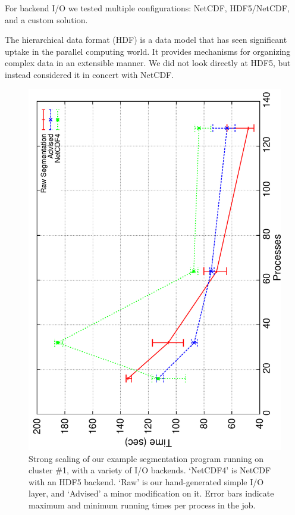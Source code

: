 
For backend I/O we tested multiple configurations: NetCDF, HDF5/NetCDF,
and a custom solution.

The hierarchical data format (HDF) is a data model that has seen
significant uptake in the parallel computing world.  It provides
mechanisms for organizing complex data in an extensible manner.  We did
not look directly at HDF5, but instead considered it in concert with
NetCDF.

\begin{figure}
  \centering
  \includegraphics[angle=270,width=\linewidth]{images/io/lens-most}
  \caption{Strong scaling of our example segmentation program running
  on cluster \#1, with a variety of I/O backends.  `NetCDF4' is NetCDF
  with an HDF5 backend.  `Raw' is our hand-generated simple I/O layer,
  and `Advised' a minor modification on it.  Error bars indicate
  maximum and minimum running times per process in the job.}
  \label{fig:lens-most}
\end{figure}

